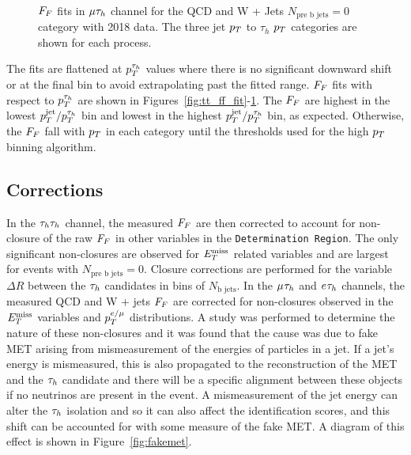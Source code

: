 \begin{figure}[!hbtp]
     \\
\caption[Plots of the fake factor fits in the $\mu\tauh$ channel.]{$F_{F}$ fits in $\mu\tauh$ channel for the QCD and W + Jets $N_{\text{pre b jets}}=0$ category with 2018 data. The three jet $p_{T}$ to $\tau_h$ $p_{T}$ categories are shown for each process.}
\label{fig:mt_ff_fit}
\end{figure}

The fits are flattened at $p_{T}^{\tau_h}$ values where there is no significant downward shift or at the final bin to avoid extrapolating past the fitted range. 
$F_{F}$ fits with respect to $p_{T}^{\tau_h}$ are shown in Figures~\ref{fig:tt_ff_fit}-\ref{fig:mt_ff_fit}. 
The $F_{F}$ are highest in the lowest $p_{T}^{\text{jet}}/p_{T}^{\tau_h}$ bin and lowest in the highest $p_{T}^{\text{jet}}/p_{T}^{\tau_h}$ bin, as expected. 
Otherwise, the $F_{F}$ fall with $p_{T}$ in each category until the thresholds used for the high $p_{T}$ binning algorithm.

\subsection{Corrections}

In the $\tau_{h}\tau_{h}$ channel, the measured $F_{F}$ are then corrected to account for non-closure of the raw $F_{F}$ in other variables in the \texttt{Determination Region}. 
The only significant non-closures are observed for $E_{T}^{\text{miss}}$ related variables and are largest for events with $N_{\text{pre b jets}}=0$. 
Closure corrections are performed for the variable $\Delta R$ between the $\tau_{h}$ candidates in bins of $N_{\text{b jets}}$.
In the $\mu_{}\tau_{h}$ and $e_{}\tau_{h}$ channels, the measured QCD and W + jets $F_{F}$ are corrected for non-closures observed in the $E_{T}^{\text{miss}}$ variables and $p_{T}^{e/\mu}$ distributions.
A study was performed to determine the nature of these non-closures and it was found that the cause was due to fake \ac{MET} arising from mismeasurement of the energies of particles in a jet. 
If a jet's energy is mismeasured, this is also propagated to the reconstruction of the \ac{MET} and the $\tau_{h}$ candidate and there will be a specific alignment between these objects if no neutrinos are present in the event.
A mismeasurement of the jet energy can alter the $\tau_{h}$ isolation and so it can also affect the identification scores, and this shift can be accounted for with some measure of the fake \ac{MET}.
A diagram of this effect is shown in Figure~\ref{fig:fakemet}. \\

